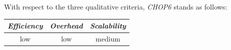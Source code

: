 %
With respect to the three qualitative criteria, \emph{CHOP6} stands as follows:
\begin{center}
{\footnotesize
\begin{tabular}{ccc}
\emph{Efficiency} & \emph{Overhead} & \emph{Scalability} \\
\hline
low &
low &
medium
\end{tabular}
}
\end{center}



